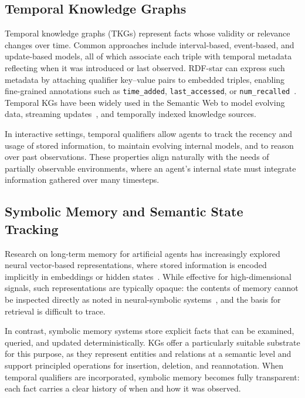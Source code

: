 \documentclass[11pt]{article}
\begin{document}
\subsection{Temporal Knowledge Graphs}

Temporal knowledge graphs (TKGs) represent facts whose validity or
relevance changes over time. Common approaches include interval-based,
event-based, and update-based models, all of which associate each
triple with temporal metadata reflecting when it was introduced or last
observed. RDF-star can express such metadata by attaching qualifier
key–value pairs to embedded triples, enabling fine-grained annotations
such as \texttt{time\_added}, \texttt{last\_accessed}, or
\texttt{num\_recalled}~\cite{moreau2012prov}. Temporal KGs have been widely used in the
Semantic Web to model evolving data, streaming updates~\cite{dellaglio2017streamreasoning}, and temporally
indexed knowledge sources.

In interactive settings, temporal qualifiers allow agents to track the
recency and usage of stored information, to maintain evolving internal
models, and to reason over past observations. These properties align
naturally with the needs of partially observable environments, where an
agent’s internal state must integrate information gathered over many
timesteps.

\subsection{Symbolic Memory and Semantic State Tracking}

Research on long-term memory for artificial agents has increasingly
explored neural vector-based representations, where stored information
is encoded implicitly in embeddings or hidden states~\cite{graves2014neural,graves2016hybrid,Wayne2018MERLIN,DBLP:journals/corr/abs-1803-10122,pritzel2017neuralepisodiccontrol,blundell2016modelfreeepisodiccontrol}. While effective for high-dimensional signals, such representations are typically opaque:
the contents of memory cannot be inspected directly as noted in neural-symbolic systems~\cite{besold2017neuralsymboliclearningreasoningsurvey}, and the basis for
retrieval is difficult to trace.

In contrast, symbolic memory systems store explicit facts that can be
examined, queried, and updated deterministically. KGs offer
a particularly suitable substrate for this purpose, as they represent
entities and relations at a semantic level and support principled
operations for insertion, deletion, and reannotation. When temporal
qualifiers are incorporated, symbolic memory becomes fully transparent:
each fact carries a clear history of when and how it was observed.
\end{document}
